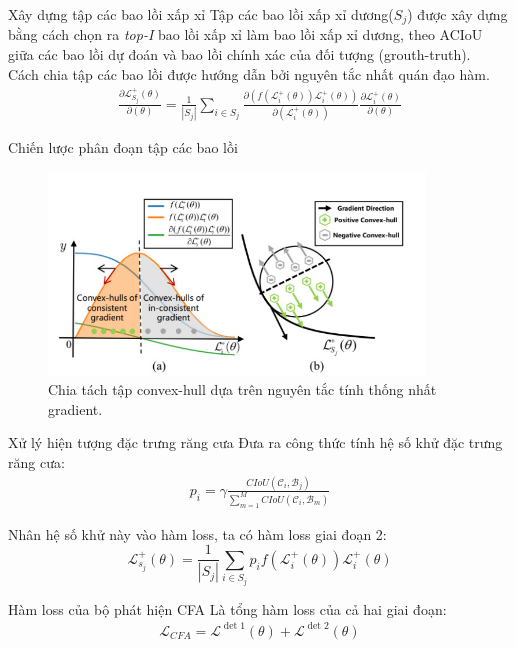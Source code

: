 \documentclass[11pt]{beamer}
\theoremstyle{definition}
\theoremstyle{plain}
\theoremstyle{plain}
\theoremstyle{remark}
\begin{document}
	\begin{frame}{Xây dựng tập các bao lồi xấp xỉ}
		Tập các bao lồi xấp xỉ dương($S_j$) được xây dựng bằng cách chọn ra \textit{top-I} bao lồi xấp xỉ làm bao lồi xấp xỉ dương, theo ACIoU giữa các bao lồi dự đoán và bao lồi chính xác của đối tượng (grouth-truth).\\
			Cách chia tập các bao lồi được hướng dẫn bởi nguyên tắc nhất quán đạo hàm.
		\begin{align} \label{ptdd7}
			\frac{\partial\mathcal{L}_{S_j}^+ (\theta)}{\partial (\theta)} = \frac{1}{|S_j|} \sum_{i \in {S_j}} \frac{\partial (f(\mathcal{L}_i^+(\theta))\mathcal{L}_i^{+}(\theta))}{\partial (\mathcal{L}_i^+(\theta))} \frac{\partial \mathcal{L}_i^+ (\theta)}{\partial (\theta)}
		\end{align}
	\end{frame}
	\begin{frame}{Chiến lược phân đoạn tập các bao lồi}
		\begin{figure}[ht!]
			\begin{center}
				\includegraphics[width=10cm]{./Hinh_9.jpg}
				\caption{Chia tách tập convex-hull dựa trên nguyên tắc tính thống nhất gradient.}
				\label{upper_convex_function}
			\end{center}
		\end{figure}
	\end{frame}
	\begin{frame}{Xử lý hiện tượng đặc trưng răng cưa}
		Đưa ra công thức tính hệ số khử đặc trưng răng cưa:
		\begin{align} \label{ptdd8}
			p_i = \gamma \frac{CIoU (\mathcal{C}_i, \mathcal{B}_j)}{\sum_{m=1}^{M} CIoU (\mathcal{C}_i, \mathcal{B}_m)}
		\end{align}
	
		Nhân hệ số khử này vào hàm loss, ta có hàm loss giai đoạn 2:\\
		\begin{equation}
			\mathcal{L}_{s_j}^{+}(\theta)=\frac{1}{\left|S_j\right|} \sum_{i \in S_j} p_i f\left(\mathcal{L}_i^{+}(\theta)\right) \mathcal{L}_i^{+}(\theta)
		\end{equation}
		
	\end{frame}
	\begin{frame}{Hàm loss của bộ phát hiện CFA}
		Là tổng hàm loss của cả hai giai đoạn:
		\begin{align}
			\mathcal{L}_{CFA} = \mathcal{L}^{\operatorname{det} 1}(\theta)+\mathcal{L}^{\operatorname{det} 2}(\theta)
		\end{align}
		
	\end{frame}
\end{document}
